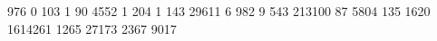 976 0 103 1 90 
4552 1 204 1 143 
29611 6 982 9 543 
213100 87 5804 135 1620 
1614261 1265 27173 2367 9017 
